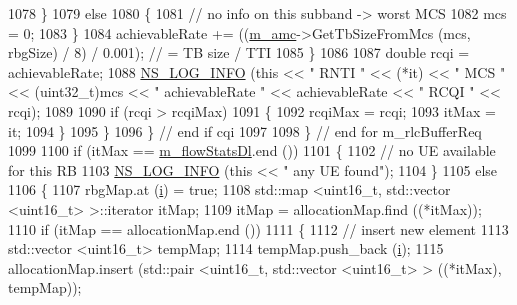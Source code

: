 \begin{DoxyCode}
1078                             \}
1079                           \textcolor{keywordflow}{else}
1080                             \{
1081                               \textcolor{comment}{// no info on this subband -> worst MCS}
1082                               mcs = 0;
1083                             \}
1084                           achievableRate += ((\hyperlink{classns3_1_1FdMtFfMacScheduler_a243eae6fea006597039d90bc727786eb}{m\_amc}->GetTbSizeFromMcs (mcs, rbgSize) / 8) / 0.001);   \textcolor{comment}{
      // = TB size / TTI}
1085                         \}
1086 
1087                       \textcolor{keywordtype}{double} rcqi = achievableRate;
1088                       \hyperlink{group__logging_gafbd73ee2cf9f26b319f49086d8e860fb}{NS\_LOG\_INFO} (\textcolor{keyword}{this} << \textcolor{stringliteral}{" RNTI "} << (*it) << \textcolor{stringliteral}{" MCS "} << (uint32\_t)mcs << \textcolor{stringliteral}{"
       achievableRate "} << achievableRate << \textcolor{stringliteral}{" RCQI "} << rcqi);
1089 
1090                       \textcolor{keywordflow}{if} (rcqi > rcqiMax)
1091                         \{
1092                           rcqiMax = rcqi;
1093                           itMax = it;
1094                         \}
1095                     \}
1096                 \}   \textcolor{comment}{// end if cqi}
1097               
1098             \} \textcolor{comment}{// end for m\_rlcBufferReq}
1099 
1100           \textcolor{keywordflow}{if} (itMax == \hyperlink{classns3_1_1FdMtFfMacScheduler_a9ab90c3a3648c998bf2ca6e6baee052c}{m\_flowStatsDl}.end ())
1101             \{
1102               \textcolor{comment}{// no UE available for this RB}
1103               \hyperlink{group__logging_gafbd73ee2cf9f26b319f49086d8e860fb}{NS\_LOG\_INFO} (\textcolor{keyword}{this} << \textcolor{stringliteral}{" any UE found"});
1104             \}
1105           \textcolor{keywordflow}{else}
1106             \{
1107               rbgMap.at (\hyperlink{bernuolliDistribution_8m_a6f6ccfcf58b31cb6412107d9d5281426}{i}) = \textcolor{keyword}{true};
1108               std::map <uint16\_t, std::vector <uint16\_t> >::iterator itMap;
1109               itMap = allocationMap.find ((*itMax));
1110               \textcolor{keywordflow}{if} (itMap == allocationMap.end ())
1111                 \{
1112                   \textcolor{comment}{// insert new element}
1113                   std::vector <uint16\_t> tempMap;
1114                   tempMap.push\_back (\hyperlink{bernuolliDistribution_8m_a6f6ccfcf58b31cb6412107d9d5281426}{i});
1115                   allocationMap.insert (std::pair <uint16\_t, std::vector <uint16\_t> > ((*itMax), tempMap));

\end{DoxyCode}
